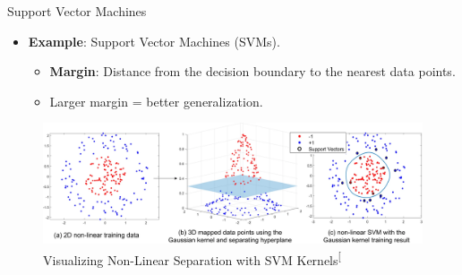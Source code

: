 \documentclass[
  ignorenonframetext,
]{beamer}
\providecommand{\tightlist}{%
  \setlength{\itemsep}{0pt}\setlength{\parskip}{0pt}}\usepackage{longtable,booktabs,array}
\begin{document}
\begin{frame}{Support Vector Machines}
\label{support-vector-machines}
\begin{itemize}
\tightlist
\item
  \textbf{Example}: Support Vector Machines (SVMs).

  \begin{itemize}
  \tightlist
  \item
    \textbf{Margin}: Distance from the decision boundary to the nearest
    data points.
  \item
    Larger margin = better generalization.
  \end{itemize}
\end{itemize}

\begin{figure}[H]

{\centering \includegraphics[width=1\linewidth,height=\textheight,keepaspectratio]{extra/svm_kernels.png}

}

\caption{Visualizing Non-Linear Separation with SVM
Kernels\textsuperscript{{[}\citeproc{ref-wang24}{6}{]}}}

\end{figure}%
\end{frame}
\end{document}
